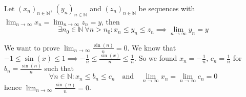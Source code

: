 \begin{proposition}\label{pro:sandwich_seq}
   Let \((x_n)_{n \in \mathbb{N}}\), \((y_n)_{n \in \mathbb{N}}\) and \((z_n)_{n \in \mathbb{N}}\) be sequences with \(\lim_{n \to \infty} x_n = \lim_{n \to \infty} z_n = y\), then
   \[\exists n_0 \in \mathbb{N}~\forall n > n_0: x_n \leq y_n \leq z_n \implies \lim_{n \to \infty} y_n = y\]
\end{proposition}
\begin{example}
   We want to prove \(\lim_{n \to \infty} \frac{\sin(n)}{n} = 0\).
   We know that \(-1 \leq \sin(x) \leq 1 \implies -\frac{1}{n} \leq \frac{\sin(x)}{n} \leq \frac{1}{n}\).
   So we found \(x_n = -\frac{1}{n}\), \(c_n = \frac{1}{n}\) for \(b_n = \frac{\sin(n)}{n}\) such that
   \[\forall n \in \mathbb{N}: x_n \leq b_n \leq c_n \quad\text{and}\quad \lim_{n \to \infty} x_n = \lim_{n \to \infty} c_n = 0\]
   hence \(\lim_{n \to \infty} \frac{\sin(n)}{n} = 0\).
\end{example}

